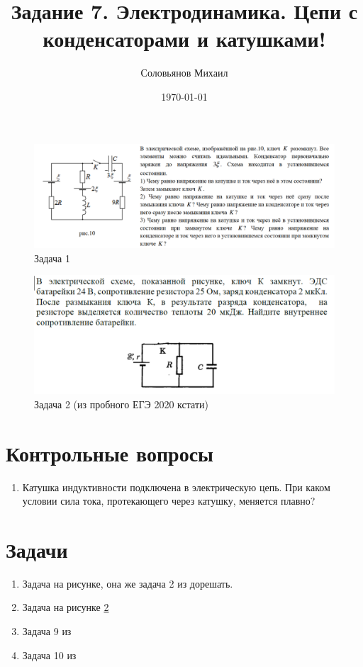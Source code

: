 \documentclass[a4paper,12pt]{article} %
\author{Соловьянов Михаил }
\title{Задание 7. Электродинамика.  Цепи с конденсаторами и катушками!}
\date{\today}
\begin{document}
\maketitle



\begin{figure}[H]
  \includegraphics[width=\linewidth]{1.PNG}
  \caption{Задача 1 }
  \label{task1}
\end{figure}
 

\begin{figure}[H]
  \includegraphics[width=\linewidth]{2.PNG}
  \caption{Задача 2 (из пробного ЕГЭ 2020 кстати) }
  \label{task2}
\end{figure}
 


\section{Контрольные вопросы}
\begin{enumerate}


\item Катушка индуктивности подключена в электрическую цепь. При каком условии сила тока, протекающего через катушку, меняется плавно?
\end{enumerate}


\section{Задачи}
\begin{enumerate}
\item Задача на рисунке, она же задача 2 из  \cite{l2} дорешать.


\item  Задача на рисунке  \ref{task2}  

\item  Задача 9 из \cite{l2}  

\item  Задача 10 из \cite{l2}  

\end{enumerate}
\end{document}
